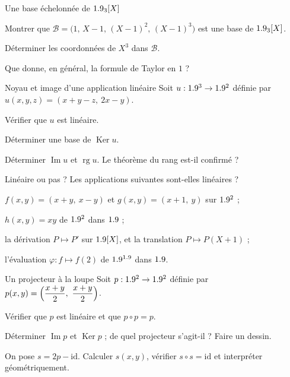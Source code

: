 \begin{exercice}[1]{Une base échelonnée de $1.9_3[X]$}
\begin{questions}
  \item Montrer que $\mathcal{B}=\bigl(1,\,X-1,\,(X-1)^{2},\,(X-1)^{3}\bigr)$
    est une base de $1.9_3[X]$.
  \item Déterminer les coordonnées de $X^{3}$ dans $\mathcal{B}$.
  \item Que donne, en général, la formule de Taylor en $1$ ?
\end{questions}
\end{exercice}

\begin{exercice}[1]{Noyau et image d'une application linéaire}
Soit $u:1.9^{3}\to1.9^{2}$ définie par $u(x,y,z)=(x+y-z,\ 2x-y)$.
\begin{questions}
  \item Vérifier que $u$ est linéaire.
  \item Déterminer une base de $\operatorname{Ker}u$.
  \item Déterminer $\operatorname{Im}u$ et $\operatorname{rg}u$. Le
    théorème du rang est-il confirmé ?
\end{questions}
\end{exercice}

\begin{exercice}[1]{Linéaire ou pas ?}
Les applications suivantes sont-elles linéaires ?
\begin{questions}
  \item $f(x,y)=(x+y,\ x-y)$ et $g(x,y)=(x+1,\ y)$ sur $1.9^{2}$ ;
  \item $h(x,y)=xy$ de $1.9^{2}$ dans $1.9$ ;
  \item la dérivation $P\mapsto P'$ sur $1.9[X]$, et la translation
    $P\mapsto P(X+1)$ ;
  \item l'évaluation $\varphi:f\mapsto f(2)$ de $1.9^{1.9}$ dans $1.9$.
\end{questions}
\end{exercice}

\begin{exercice}[1]{Un projecteur à la loupe}
Soit $p:1.9^{2}\to1.9^{2}$ définie par
$p(x,y)=\Bigl(\dfrac{x+y}{2},\ \dfrac{x+y}{2}\Bigr)$.
\begin{questions}
  \item Vérifier que $p$ est linéaire et que $p\circ p=p$.
  \item Déterminer $\operatorname{Im}p$ et $\operatorname{Ker}p$ ; de quel
    projecteur s'agit-il ? Faire un dessin.
  \item On pose $s=2p-\mathrm{id}$. Calculer $s(x,y)$, vérifier
    $s\circ s=\mathrm{id}$ et interpréter géométriquement.
\end{questions}
\end{exercice}

